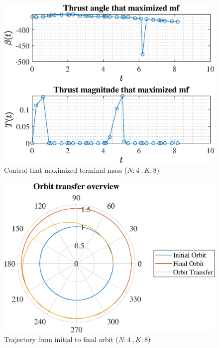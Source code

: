 \documentclass[]{article}
\begin{document}
	\begin{figure}
		\centering
		\includegraphics[scale=0.75]{control_N4_K8_C2_mf.eps}
		\caption{Control that maximized terminal mass (\(N:4\ , K:8\))}
		\label{fig:control_N4_K8_C2_mf}
	\end{figure}
	\begin{figure}
		\centering
		\includegraphics[scale=0.75]{orbit_N4_K8_C2_mf.eps}
		\caption{Trajectory from initial to final orbit (\(N:4\ , K:8\))}
		\label{fig:orbit_N4_K8_C2_mf}
	\end{figure}
\end{document}
